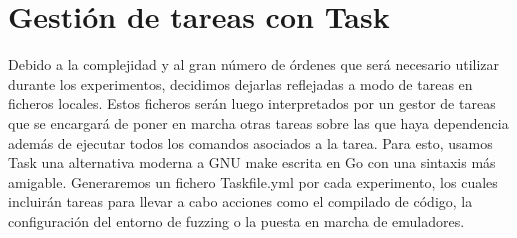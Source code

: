 \section{Gestión de tareas con Task}
Debido a la complejidad y al gran número de órdenes que será necesario utilizar durante los experimentos, decidimos dejarlas reflejadas a modo de tareas
en ficheros locales. Estos ficheros serán luego interpretados por un gestor de tareas que se encargará de poner en marcha otras tareas sobre las que haya 
dependencia además de ejecutar todos los comandos asociados a la tarea. Para esto, usamos Task\cite{task} una alternativa moderna a GNU make escrita en Go con una sintaxis más 
amigable. Generaremos un fichero Taskfile.yml por cada experimento, los cuales incluirán tareas para llevar a cabo acciones como el compilado de código,
la configuración del entorno de fuzzing o la puesta en marcha de emuladores.